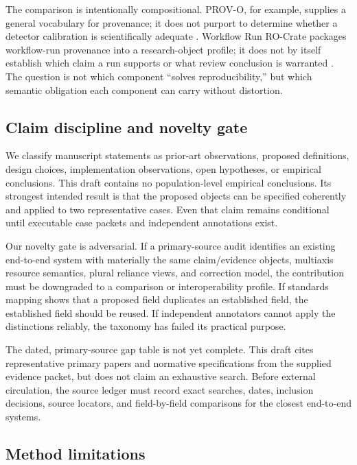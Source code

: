 \documentclass[11pt]{article}
\begin{document}
The comparison is intentionally compositional. PROV-O, for example, supplies a general vocabulary for provenance; it does not purport to determine whether a detector calibration is scientifically adequate \citep{w3c-prov-o-2013}. Workflow Run RO-Crate packages workflow-run provenance into a research-object profile; it does not by itself establish which claim a run supports or what review conclusion is warranted \citep{workflow-run-ro-crate-2024}. The question is not which component ``solves reproducibility,'' but which semantic obligation each component can carry without distortion.

\subsection{Claim discipline and novelty gate}

We classify manuscript statements as prior-art observations, proposed definitions, design choices, implementation observations, open hypotheses, or empirical conclusions. This draft contains no population-level empirical conclusions. Its strongest intended result is that the proposed objects can be specified coherently and applied to two representative cases. Even that claim remains conditional until executable case packets and independent annotations exist.

Our novelty gate is adversarial. If a primary-source audit identifies an existing end-to-end system with materially the same claim/evidence objects, multiaxis resource semantics, plural reliance views, and correction model, the contribution must be downgraded to a comparison or interoperability profile. If standards mapping shows that a proposed field duplicates an established field, the established field should be reused. If independent annotators cannot apply the distinctions reliably, the taxonomy has failed its practical purpose.

\begin{evidencegate}
The dated, primary-source gap table is not yet complete. This draft cites representative primary papers and normative specifications from the supplied evidence packet, but does not claim an exhaustive search. Before external circulation, the source ledger must record exact searches, dates, inclusion decisions, source locators, and field-by-field comparisons for the closest end-to-end systems.
\end{evidencegate}

\subsection{Method limitations}
\end{document}
